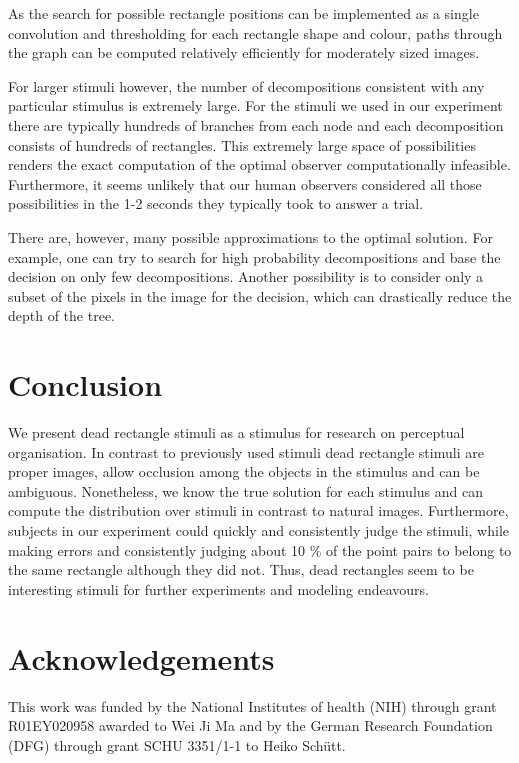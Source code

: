 \documentclass[10pt,letterpaper]{article}
\begin{document}
As the search for possible rectangle positions can be implemented as a single convolution and thresholding for each rectangle shape and colour, paths through the graph can be computed relatively efficiently for moderately sized images. 

For larger stimuli however, the number of decompositions consistent with any particular stimulus is extremely large. For the stimuli we used in our experiment there are typically hundreds of branches from each node and each decomposition consists of hundreds of rectangles. This extremely large space of possibilities renders the exact computation of the optimal observer computationally infeasible. Furthermore, it seems unlikely that our human observers considered all those possibilities in the 1-2 seconds they typically took to answer a trial. 

There are, however, many possible approximations to the optimal solution. For example, one can try to search for high probability decompositions and base the decision on only few decompositions. Another possibility is to consider only a subset of the pixels in the image for the decision, which can drastically reduce the depth of the tree. 

\section{Conclusion}
We present dead rectangle stimuli as a stimulus for research on perceptual organisation. In contrast to previously used stimuli dead rectangle stimuli are proper images, allow occlusion among the objects in the stimulus and can be ambiguous. Nonetheless, we know the true solution for each stimulus and can compute the distribution over stimuli in contrast to natural images. Furthermore, subjects in our experiment could quickly and consistently judge the stimuli, while making errors and consistently judging about 10 \% of the point pairs to belong to the same rectangle although they did not. Thus, dead rectangles seem to be interesting stimuli for further experiments and modeling endeavours. 

\section{Acknowledgements}
This work was funded by the National Institutes of health (NIH) through grant R01EY020958 awarded to Wei Ji Ma and by the German Research Foundation (DFG) through grant SCHU 3351/1-1 to Heiko Schütt.




\setlength{\bibleftmargin}{.125in}
\setlength{\bibindent}{-\bibleftmargin}


\end{document}
